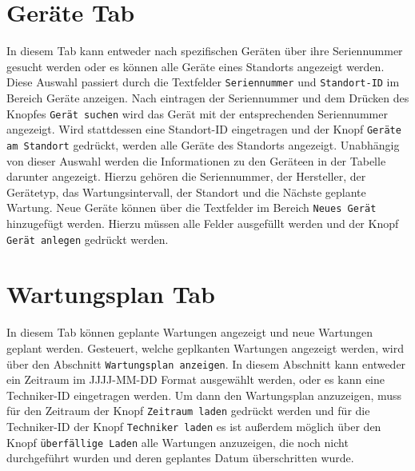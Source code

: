 \documentclass[11pt,a4paper]{article}
\begin{document}
\section{Geräte Tab}
In diesem Tab kann entweder nach spezifischen Geräten über ihre Seriennummer gesucht werden 
oder es können alle Geräte eines Standorts angezeigt werden. Diese Auswahl passiert durch die Textfelder {\texttt{Seriennummer}} 
und {\texttt{Standort-ID}} im Bereich Geräte anzeigen. Nach eintragen der Seriennummer und dem Drücken des Knopfes {\texttt{Gerät suchen}}
 wird das Gerät mit der entsprechenden Seriennummer angezeigt. Wird stattdessen eine Standort-ID eingetragen und der Knopf {\texttt{Geräte am Standort}} 
 gedrückt, werden alle Geräte des Standorts angezeigt.
Unabhängig von dieser Auswahl werden die Informationen zu den Geräteen in der Tabelle darunter angezeigt. 
Hierzu gehören die Seriennummer, der Hersteller, der Gerätetyp, das Wartungsintervall, der Standort und die Nächste geplante Wartung.
Neue Geräte können über die Textfelder im Bereich {\texttt{Neues Gerät}} hinzugefügt werden. 
Hierzu müssen alle Felder ausgefüllt werden und der Knopf {\texttt{Gerät anlegen}} gedrückt werden.

\section{Wartungsplan Tab}

In diesem Tab können geplante Wartungen angezeigt und neue Wartungen geplant werden.
Gesteuert, welche geplkanten Wartungen angezeigt werden, wird über den Abschnitt {\texttt{Wartungsplan anzeigen}}.
In diesem Abschnitt kann entweder ein Zeitraum im JJJJ-MM-DD Format ausgewählt werden, oder es kann eine Techniker-ID eingetragen werden.
Um dann den Wartungsplan anzuzeigen, muss für den Zeitraum der Knopf {\texttt{Zeitraum laden}} gedrückt werden und 
für die Techniker-ID der Knopf {\texttt{Techniker laden}} es ist außerdem möglich über den Knopf {\texttt{überfällige Laden}} alle
Wartungen anzuzeigen, die noch nicht durchgeführt wurden und deren geplantes Datum überschritten wurde.
\end{document}
